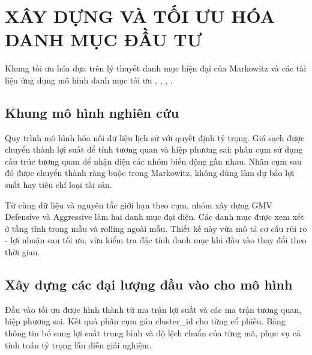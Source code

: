 \documentclass[12pt,a4paper,openany,oneside]{book}
\begin{document}
\chapter{XÂY DỰNG VÀ TỐI ƯU HÓA DANH MỤC ĐẦU TƯ}\label{Toc227188439}
Khung tối ưu hóa dựa trên lý thuyết danh mục hiện đại của Markowitz và các tài liệu ứng dụng mô hình danh mục tối ưu \cite{ref03}, \cite{ref05}, \cite{ref10}, \cite{ref11}.

\section{Khung mô hình nghiên cứu}\label{Toc227188440}
Quy trình mô hình hóa nối dữ liệu lịch sử với quyết định tỷ trọng. Giá sạch được chuyển thành lợi suất để tính tương quan và hiệp phương sai; phân cụm sử dụng cấu trúc tương quan để nhận diện các nhóm biến động gần nhau. Nhãn cụm sau đó được chuyển thành ràng buộc trong Markowitz, không dùng làm dự báo lợi suất hay tiêu chí loại tài sản.

Từ cùng dữ liệu và nguyên tắc giới hạn theo cụm, nhóm xây dựng GMV Defensive và Aggressive làm hai danh mục đại diện. Các danh mục được xem xét ở tầng tĩnh trong mẫu và rolling ngoài mẫu. Thiết kế này vừa mô tả cơ cấu rủi ro - lợi nhuận sau tối ưu, vừa kiểm tra đặc tính danh mục khi đầu vào thay đổi theo thời gian.

\section{Xây dựng các đại lượng đầu vào cho mô hình}\label{Toc227188441}
Đầu vào tối ưu được hình thành từ ma trận lợi suất và các ma trận tương quan, hiệp phương sai. Kết quả phân cụm gán cluster\_id cho từng cổ phiếu. Bảng thông tin bổ sung lợi suất trung bình và độ lệch chuẩn của từng mã, phục vụ cả tính toán tỷ trọng lẫn diễn giải nghiệm.
\end{document}

